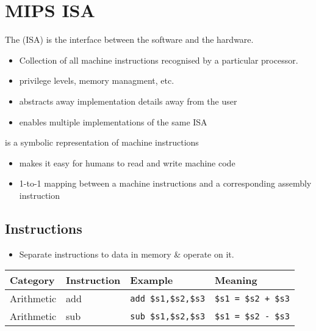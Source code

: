 \documentclass{article}
\newcommand{\T}[1]{\texttt{#1}}
\begin{document}
\section{MIPS ISA}
\begin{definition}
	The  (ISA) is the interface between
	the software and the hardware.
	\begin{itemize}
		\item Collection of all machine instructions recognised by
					a particular processor.
		\item privilege levels, memory managment, etc.
		\item abstracts away implementation details away from the user
		\item enables multiple implementations of the same ISA
	\end{itemize}
\end{definition}
\begin{definition}
	 is a symbolic representation of machine instructions
	\begin{itemize}
		\item makes it easy for humans to read and write machine code
		\item 1-to-1 mapping between a machine instructions and a corresponding
			    assembly instruction
	\end{itemize}
\end{definition}
\subsection{Instructions}
\begin{itemize}
	\item Separate instructions to  data in memory \& operate on it.
\end{itemize}

\begin{tabular}{| l | l | l | l |}
	\hline
	Category & Instruction & Example & Meaning	\\
	\hline
	\hline
	Arithmetic & add & \T{add \$s1,\$s2,\$s3} & \T{\$s1 = \$s2 + \$s3} \\
	\hline
	Arithmetic & sub & \T{sub \$s1,\$s2,\$s3} & \T{\$s1 = \$s2 - \$s3} \\
	\hline
\end{tabular}
\end{document}

